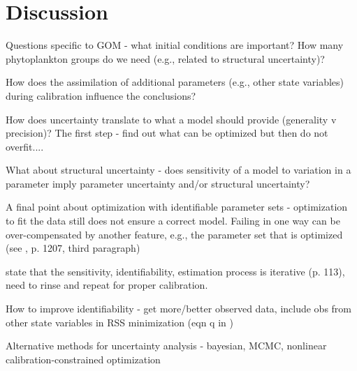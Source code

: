 \documentclass[letterpaper,12pt,oneside]{article}\usepackage[]{graphicx}\usepackage[]{color}
\begin{document}
\section{Discussion}

Questions specific to GOM - what initial conditions are important? How many phytoplankton groups do we need (e.g., related to structural uncertainty)?

How does the assimilation of additional parameters (e.g., other state variables) during calibration influence the conclusions?

How does uncertainty translate to what a model should provide (generality v precision)?  The first step - find out what can be optimized but then do not overfit....

What about structural uncertainty - does sensitivity of a model to variation in a parameter imply parameter uncertainty and/or structural uncertainty?

A final point about optimization with identifiable parameter sets - optimization to fit the data still does not ensure a correct model.  Failing in one way can be over-compensated by another feature, e.g., the parameter set that is optimized (see \cite{Flynn05}, p. 1207, third paragraph)

\cite{Omlin01} state that the sensitivity, identifiability, estimation process is iterative (p. 113), need to rinse and repeat for proper calibration. 

How to improve identifiability - get more/better observed data, include obs from other state variables in RSS minimization (eqn q in \cite{Omlin01})

Alternative methods for uncertainty analysis - bayesian, MCMC, nonlinear calibration-constrained optimization \citep{Gallagher07}

\clearpage
\begin{singlespace}


\end{singlespace}
\clearpage

\end{document}
